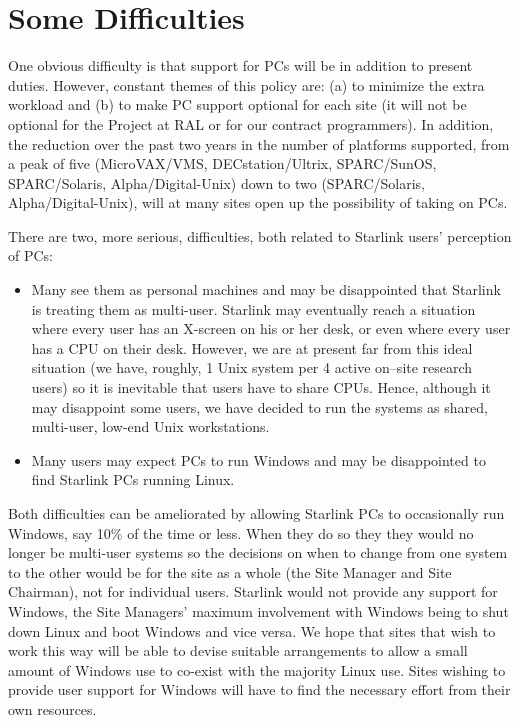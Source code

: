 \documentclass[twoside,11pt]{article}
\begin{document}
\section{Some Difficulties}

One obvious difficulty is that support for PCs will be in addition to
present duties.  However, constant themes of this policy are: (a) to
minimize the extra workload and (b) to make PC support optional for
each site (it will not be optional for the Project at RAL or for our
contract programmers).  In addition,  the reduction over the past two
years in the number of platforms supported, from a peak of five
(MicroVAX/VMS, DECstation/Ultrix, SPARC/SunOS, SPARC/Solaris,
Alpha/Digital-Unix) down to two (SPARC/Solaris, Alpha/Digital-Unix), 
will at many sites open up the possibility of taking on PCs.

There are two, more serious, difficulties, both related to Starlink
users' perception of PCs:  \begin{itemize} \item Many see them as
personal machines and may be disappointed that Starlink is treating
them as multi-user.  Starlink may eventually reach a situation where
every user has an X-screen on his or her desk, or even where every user
has a CPU on their desk.  However, we are at present far from this
ideal situation (we have, roughly, 1 Unix system per 4 active on--site
research users) so it is inevitable that users have to share CPUs.
Hence, although it may disappoint some users, we have decided to run
the systems as shared, multi-user, low-end Unix workstations.

\item Many users may expect PCs to run Windows and may be disappointed
to find Starlink PCs running Linux.  \end{itemize}

Both difficulties can be ameliorated by allowing Starlink PCs to
occasionally run Windows, say 10\% of the time or less.  When they do
so they they would no longer be multi-user systems so the decisions on
when to change from one system to the other would be for the site as a
whole (the Site Manager and Site Chairman), not for individual users.
Starlink would not provide any support for Windows, the Site Managers'
maximum involvement with Windows being to shut down Linux and boot Windows
and vice versa.  We hope that sites that wish to work this way will be
able to devise suitable arrangements to allow a small amount of Windows
use to  co-exist with the majority Linux use. Sites wishing to provide 
user support for Windows will have to find the necessary effort from their
own resources.
\end{document}
